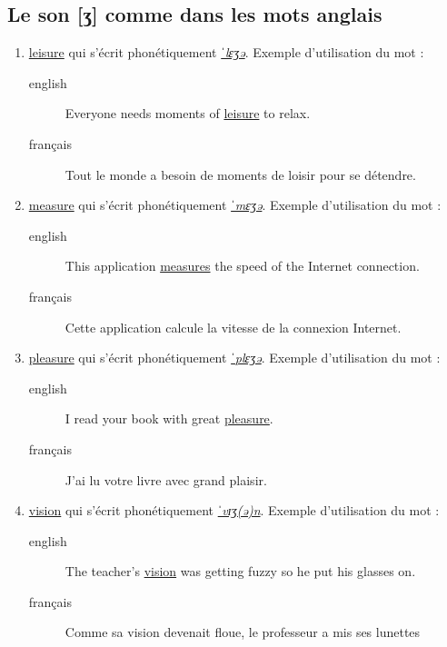 \subsection{Le son [ʒ] comme dans les mots anglais}
\label{sec:orga03cd2d}
\begin{enumerate}
\item \href{http://www.wordreference.com/enfr/leisure}{leisure} qui s'écrit phonétiquement \href{https://en.oxforddictionaries.com/definition/leisure}{\emph{ˈlɛʒə}}. Exemple d'utilisation du mot :
\begin{description}
\item[{english}] \textenglish{Everyone needs moments of \href{https://youtu.be/VSRFE7E4qWI}{leisure} to relax.}
\item[{français}] Tout le monde a besoin de moments de loisir pour se
détendre.
\end{description}
\item \href{http://www.wordreference.com/enfr/measure}{measure} qui s'écrit phonétiquement \href{https://en.oxforddictionaries.com/definition/measure}{\emph{ˈmɛʒə}}. Exemple d'utilisation du mot :
\begin{description}
\item[{english}] \textenglish{This application \href{https://youtu.be/bN60fb9fzKg}{measures} the speed of the Internet
connection.}
\item[{français}] Cette application calcule la vitesse de la connexion
Internet.
\end{description}
\item \href{http://www.wordreference.com/enfr/pleasure}{pleasure} qui s'écrit phonétiquement \href{https://en.oxforddictionaries.com/definition/pleasure}{\emph{ˈplɛʒə}}. Exemple d'utilisation du mot :
\begin{description}
\item[{english}] \textenglish{I read your book with great \href{https://youtu.be/Q4-VK5uqY34}{pleasure}.}
\item[{français}] J'ai lu votre livre avec grand plaisir.
\end{description}
\item \href{http://www.wordreference.com/enfr/vision}{vision} qui s'écrit phonétiquement \href{https://en.oxforddictionaries.com/definition/vision}{\emph{ˈvɪʒ(ə)n}}. Exemple d'utilisation du mot :
\begin{description}
\item[{english}] \textenglish{The teacher's \href{https://youtu.be/lk7lIhAmwHI}{vision} was getting fuzzy so he put his
glasses on.}
\item[{français}] Comme sa vision devenait floue, le professeur a mis
ses lunettes
\end{description}
\end{enumerate}
